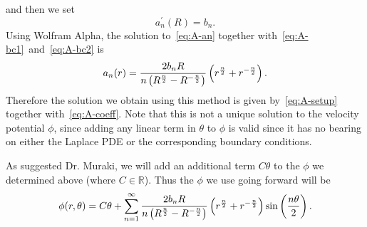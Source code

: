 \documentclass{article}
\begin{document}
%
and then we set
%
\begin{equation}
    a_n^\prime(R) = b_n
    \label{eq:A-bc2}
    .
\end{equation}
%
Using Wolfram Alpha, the solution to~\eqref{eq:A-an} together
with~\eqref{eq:A-bc1}~and~\eqref{eq:A-bc2} is
%
\begin{equation}
    a_n(r) = \frac{2 b_n R}{n \del{R^{\frac{n}{2}} - R^{- \frac{n}{2}}}} \del{r^{\frac{n}{2}} + r^{- \frac{n}{2}}}
    \label{eq:A-coeff}
    .
\end{equation}
%
Therefore the solution we obtain using this method is given
by~\eqref{eq:A-setup} together with~\eqref{eq:A-coeff}. Note that this
is not a unique solution to the velocity potential $\phi$, since adding
any linear term in $\theta$ to $\phi$ is valid since it has no bearing
on either the Laplace PDE or the corresponding boundary conditions.

As suggested Dr. Muraki, we will add an additional term $C \theta$ to
the $\phi$ we determined above (where $C \in \mathbb{R}$). Thus the
$\phi$ we use going forward will be
%
\begin{equation}
    \phi(r, \theta) = C \theta
        + \sum_{n = 1}^\infty
            \frac{2 b_n R}{n \del{R^{\frac{n}{2}} - R^{- \frac{n}{2}}}} \del{r^{\frac{n}{2}} + r^{- \frac{n}{2}}}
        \sin \del{\frac{n \theta}{2}}
    .
\end{equation}
\end{document}
